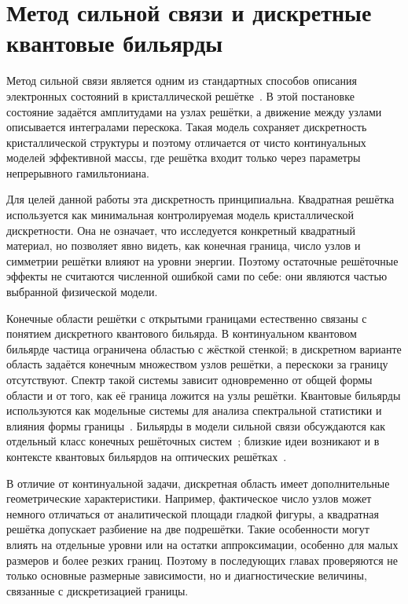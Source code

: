 \section{Метод сильной связи и дискретные квантовые бильярды}

Метод сильной связи является одним из стандартных способов описания электронных состояний
в кристаллической решётке~\cite{slater1954lcao,datta2005quantumtransport}. В этой
постановке состояние задаётся амплитудами на узлах решётки, а движение между узлами
описывается интегралами перескока. Такая модель сохраняет дискретность кристаллической
структуры и поэтому отличается от чисто континуальных моделей эффективной массы, где
решётка входит только через параметры непрерывного гамильтониана.

Для целей данной работы эта дискретность принципиальна. Квадратная решётка используется
как минимальная контролируемая модель кристаллической дискретности. Она не означает, что
исследуется конкретный квадратный материал, но позволяет явно видеть, как конечная
граница, число узлов и симметрии решётки влияют на уровни энергии. Поэтому остаточные
решёточные эффекты не считаются численной ошибкой сами по себе: они являются частью
выбранной физической модели.

Конечные области решётки с открытыми границами естественно связаны с понятием дискретного
квантового бильярда. В континуальном квантовом бильярде частица ограничена областью с
жёсткой стенкой; в дискретном варианте область задаётся конечным множеством узлов решётки,
а перескоки за границу отсутствуют. Спектр такой системы зависит одновременно от общей
формы области и от того, как её граница ложится на узлы решётки. Квантовые бильярды
используются как модельные системы для анализа спектральной статистики и влияния формы
границы~\cite{berry1981sinai,stockmann1990quantumchaos,cuevas1996chaoticbilliards}.
Бильярды в модели сильной связи обсуждаются как отдельный класс конечных решёточных
систем~\cite{ulcakar2022tightbindingbilliards}; близкие идеи возникают и в контексте
квантовых бильярдов на оптических решётках~\cite{montangero2008quantumbilliards}.

В отличие от континуальной задачи, дискретная область имеет дополнительные геометрические
характеристики. Например, фактическое число узлов может немного отличаться от
аналитической площади гладкой фигуры, а квадратная решётка допускает разбиение на две
подрешётки. Такие особенности могут влиять на отдельные уровни или на остатки
аппроксимации, особенно для малых размеров и более резких границ. Поэтому в последующих
главах проверяются не только основные размерные зависимости, но и диагностические
величины, связанные с дискретизацией границы.

